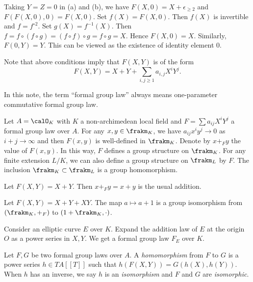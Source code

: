   \begin{remark}
    Taking $Y=Z = 0$ in (a) and (b), we have $F(X,0) = X + \epsilon_{\geq 2}$ and $F(F(X,0),0) = F(X,0)$.
    Set $f(X) = F(X,0)$. 
    Then $f(X)$ is invertible and $f = f^{\circ 2}$.
    Set $g(X) = f^{-1}(X)$. 
    Then $f = f\circ (f \circ g) = (f \circ f) \circ g = f \circ g = X$.
    Hence $F(X,0) = X$.
    Similarly, $F(0,Y) = Y$.
    This can be viewed as the existence of identity element $0$.
  \end{remark}

  Note that above conditions imply that $F(X,Y)$ is of the form
  \[ F(X,Y) = X + Y + \sum_{i,j \geq 1} a_{i,j} X^i Y^j. \]

  In this note, the term ``formal group law'' always means one-parameter commutative formal group law.

  Let $A = \calO_K$ with $K$ a non-archimedean local field and $F = \sum a_{ij} X^i Y^j$ a formal group law over $A$.
  For any $x,y \in \frakm_K$, we have $a_{ij} x^i y^j \to 0$ as $i+j \to \infty$ and then $F(x,y)$ is well-defined in $\frakm_K$.
  Denote by $x +_F y$ the value of $F(x,y)$.
  In this way, $F$ defines a group structure on $\frakm_K$.
  For any finite extension $L/K$, we can also define a group structure on $\frakm_L$ by $F$.
  The inclusion $\frakm_K \subset \frakm_L$ is a group homomorphism.

  \begin{example}
    Let $F(X,Y) = X + Y$.
    Then $x +_F y = x+y$ is the usual addition.
  \end{example}

  \begin{example}
    Let $F(X,Y) = X + Y + XY$.
    The map $a \mapsto a + 1$ is a group isomorphism from $(\frakm_K, +_F)$ to $(1+\frakm_K, \cdot)$.
  \end{example}

  \begin{example}
    Consider an elliptic curve $E$ over $K$.
    Expand the addition law of $E$ at the origin $O$ as a power series in $X,Y$.
    We get a formal group law $F_E$ over $K$.
  \end{example}

  \begin{definition}
    Let $F,G$ be two formal group laws over $A$.
    A \emph{homomorphism} from $F$ to $G$ is a power series $h \in T A[[T]]$ such that $h(F(X,Y)) = G(h(X),h(Y))$.
    When $h$ has an inverse, we say $h$ is an \emph{isomorphism} and $F$ and $G$ are \emph{isomorphic}.
  \end{definition}

